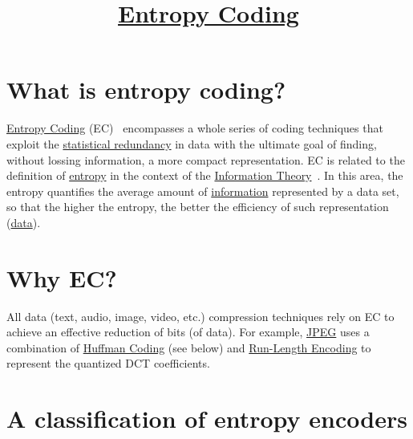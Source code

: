 



\title{\href{https://sistemas-multimedia.github.io/contents/entropy_coding/}{Entropy Coding}}

\maketitle

\tableofcontents

\section{What is entropy coding?}

\href{https://en.wikipedia.org/wiki/Entropy_coding}{Entropy Coding}
(EC)~\cite{vruiz__entropy_coding} encompasses a whole series of coding
techniques that exploit the
\href{https://en.wikipedia.org/wiki/Redundancy_(information_theory)}{statistical
  redundancy} in data with the ultimate goal of finding, without
lossing information, a more compact representation. EC is related to
the definition of
\href{https://en.wikipedia.org/wiki/Entropy_(information_theory)}{entropy}
in the context of the
\href{https://en.wikipedia.org/wiki/Information_theory}{Information
  Theory}~\cite{vruiz__information_theory}. In this area, the entropy
quantifies the average amount of
\href{https://en.wikipedia.org/wiki/Information}{information}
represented by a data set, so that the higher the entropy, the better
the efficiency of such representation
(\href{https://en.wikipedia.org/wiki/Data}{data}).

\section{Why EC?}
All data (text, audio, image, video, etc.) compression techniques rely
on EC to achieve an effective reduction of bits (of data). For example,
\href{https://en.wikipedia.org/wiki/JPEG}{JPEG} uses a combination of
\href{https://en.wikipedia.org/wiki/Huffman_coding}{Huffman Coding}
(see below) and
\href{https://en.wikipedia.org/wiki/Run-length_encoding}{Run-Length
  Encoding} to represent the quantized DCT coefficients.

\section{A classification of entropy encoders}


